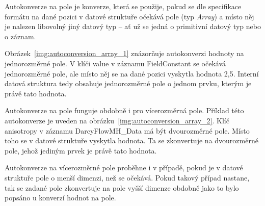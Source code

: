 \documentclass[FM,bw,DP]{tulthesis}
\begin{document}
Autokonverze na pole je konverze, která se použije, pokud se dle specifikace formátu na dané pozici v datové struktuře očekává pole (typ \textit{Array}) a místo něj je nalezen libovolný jiný datový typ -- ať už se jedná o primitivní datový typ nebo o záznam.

Obrázek~\ref{img:autoconversion_array_1} znázorňuje autokonverzi hodnoty na jednorozměrné pole. V klíči value v záznamu FieldConstant se očekává jednorozměrné pole, ale místo něj se na dané pozici vyskytla hodnota 2,5. Interní datová struktura tedy obsahuje jednorozměrné pole o jednom prvku, kterým je právě tato hodnota.

Autokonverze na pole funguje obdobně i pro vícerozměrná pole. Příklad této autokonverze je uveden na obrázku~\ref{img:autoconversion_array_2}. Klíč anisotropy v záznamu DarcyFlowMH\_Data má být dvourozměrné pole. Místo toho se v datové struktuře vyskytla hodnota. Ta se zkonvertuje na dvourozměrné pole, jehož jediným prvek je právě tato hodnota.

Autokonverze na vícerozměrné pole proběhne i v případě, pokud je v datové struktuře pole o menší dimenzi, než se očekává. Pokud takový případ nastane, tak se zadané pole zkonvertuje na pole vyšší dimenze obdobně jako to bylo popsáno u konverzí hodnot na pole.
\end{document}
